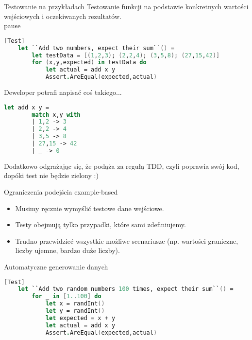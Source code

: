 \begin{frame}[fragile]{Testowanie na przykładach}
    Testowanie funkcji na podstawie konkretnych wartości wejściowych i oczekiwanych rezultatów.\\pause
    \begin{lstlisting}[language=FSharp, xleftmargin=-10pt,xrightmargin=-10pt,numbers=none]
    [Test]
    let ``Add two numbers, expect their sum``() =
        let testData = [(1,2,3); (2,2,4); (3,5,8); (27,15,42)]
        for (x,y,expected) in testData do
            let actual = add x y
            Assert.AreEqual(expected,actual)
        \end{lstlisting}
\end{frame}
    
    
\begin{frame}[fragile]{Deweloper potrafi napisać coś takiego...}
    \begin{lstlisting}[language=FSharp, xleftmargin=-10pt,xrightmargin=-10pt,numbers=none]
    let add x y =
        match x,y with
        | 1,2 -> 3
        | 2,2 -> 4
        | 3,5 -> 8
        | 27,15 -> 42
        | _ -> 0
    \end{lstlisting}
    Dodatkowo odgrażając się, że podąża za regułą TDD, czyli poprawia swój kod, dopóki test nie będzie zielony :)
\end{frame}
    
\begin{frame}{Ograniczenia podejścia example-based}
    \begin{itemize}
        \item Musimy ręcznie wymyślić testowe dane wejściowe.
        \item Testy obejmują tylko przypadki, które sami zdefiniujemy.
        \item Trudno przewidzieć wszystkie możliwe scenariusze (np. wartości graniczne, liczby ujemne, bardzo duże liczby).
    \end{itemize}
\end{frame}

\begin{frame}[fragile]{Automatyczne generowanie danych}
    \begin{lstlisting}[language=FSharp, xleftmargin=-20pt,xrightmargin=-10pt,numbers=none]
    [Test]
    let ``Add two random numbers 100 times, expect their sum``() =
        for _ in [1..100] do
            let x = randInt()
            let y = randInt()
            let expected = x + y
            let actual = add x y
            Assert.AreEqual(expected,actual)
    \end{lstlisting}
\end{frame}
    

